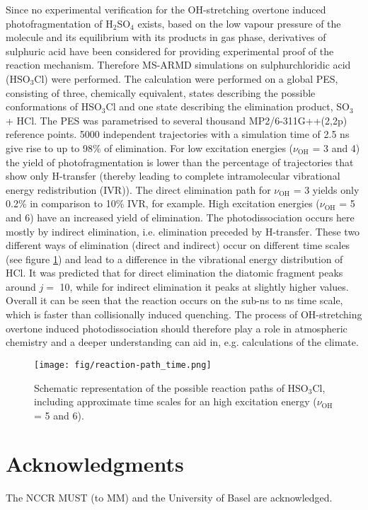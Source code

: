 \documentclass[journal=jacsat,manuscript=article]{achemso}
\begin{document}
\noindent
Since no experimental verification for the OH-stretching overtone induced photofragmentation of H$_2$SO$_4$ exists, based on the low vapour pressure of the molecule and its equilibrium with its products in gas phase, derivatives of sulphuric acid have been considered for providing experimental proof of the reaction mechanism. Therefore MS-ARMD simulations on  sulphurchloridic acid (HSO$_3$Cl) were performed\cite{reyesbrickel.pccp.2016.msarmd}. The calculation were performed on a global PES, consisting of three, chemically equivalent, states describing the possible conformations of HSO$_3$Cl and one state describing the elimination product, SO$_3$ + HCl. The PES was parametrised to several thousand MP2/6-311G++(2,2p) reference points. 5000 independent trajectories with a simulation time of 2.5 ns give rise to up to 98\% of elimination. For low excitation energies ($\nu_{\text{OH}}$ = 3 and 4) the yield of photofragmentation is lower than the percentage of trajectories that show only H-transfer (thereby leading to complete intramolecular vibrational energy redistribution (IVR)). The direct elimination path for $\nu_{\text{OH}}$ = 3 yields only 0.2\% in comparison to 10\% IVR, for example. High excitation  energies ($\nu_{\text{OH}}$ = 5 and 6) have an increased yield of elimination. The photodissociation occurs here mostly by indirect elimination, i.e. elimination preceded by H-transfer. These two different ways of elimination (direct and indirect) occur on different time scales (see figure \ref{fig:vibphotodis}) and lead to a difference in the vibrational energy distribution of HCl. It was predicted that for direct elimination the diatomic fragment peaks around $j = $ 10, while for indirect elimination it peaks at slightly higher values. Overall it can be seen that the reaction occurs on the sub-ns to ns time scale, which is faster than collisionally induced quenching. The process of OH-stretching overtone induced photodissociation should therefore play a role in atmospheric chemistry and a deeper understanding can aid in, e.g. calculations of the climate.

\begin{figure}
	\texttt{[image: fig/reaction-path\_time.png]}
	\caption{Schematic representation of the possible reaction paths of HSO$_3$Cl, including approximate time scales for an high excitation energy ($\nu_{\text{OH}}$ = 5 and 6).}
	\label{fig:vibphotodis}
\end{figure} 
    
\section*{Acknowledgments}
The NCCR MUST (to MM) and the University of Basel are acknowledged.



\end{document}
